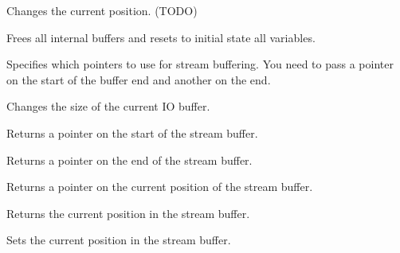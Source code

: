 \label{wxstreambufferseek}


Changes the current position. (TODO)



Frees all internal buffers and resets to initial state all variables.



Specifies which pointers to use for stream buffering. You need to pass a pointer on the
start of the buffer end and another on the end.



Changes the size of the current IO buffer.



Returns a pointer on the start of the stream buffer.



Returns a pointer on the end of the stream buffer.



Returns a pointer on the current position of the stream buffer.



Returns the current position in the stream buffer.



Sets the current position in the stream buffer.


